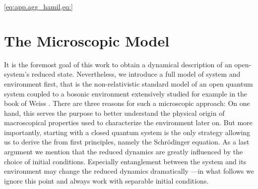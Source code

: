 \ref{eq:app.agg_hamil,eq:}
\section{The Microscopic Model}
\label{sec:nmqsd.model}
%
%

It is the foremost goal of this work to obtain a dynamical description of an open-system's reduced state.
Nevertheless, we introduce a full model of system and environment first, that is the non-relativistic standard model of an open quantum system coupled to a bosonic environment extensively studied for example in the book of Weiss \cite{We99_dissipative_systems}.
There are three reasons for such a microscopic approach:
On one hand, this serves the purpose to better understand the physical origin of macroscopical properties used to characterize the environment later on.
But more importantly, starting with a closed quantum system is the only strategy allowing us to derive the \NMSSE from first principles, namely the Schrödinger equation.
As a last argument we mention that the reduced dynamics are greatly influenced by the choice of initial conditions.
Especially entanglement between the system and its environment may change the reduced dynamics dramatically \cite{PhysRevA.64.062106}---in what follows we ignore this point and always work with separable initial conditions.\\



